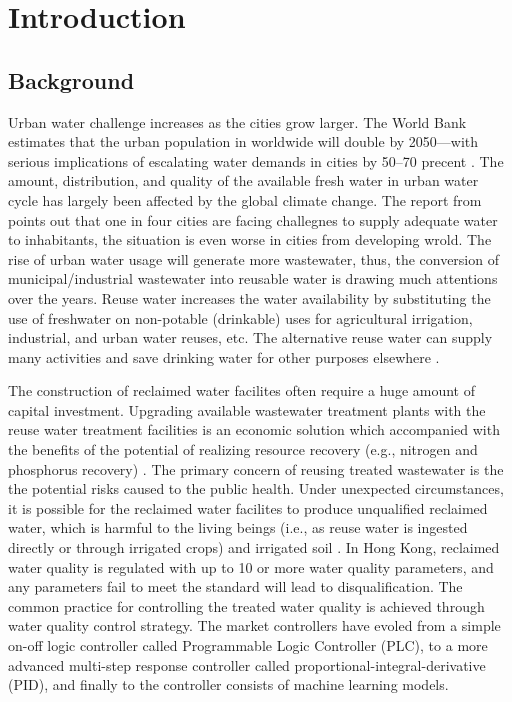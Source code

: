 \chapter{Introduction}
\section{Background}
Urban water challenge increases as the cities grow larger. The World Bank estimates that the urban population in worldwide will double by 2050---with serious implications of escalating water demands in cities by 50--70 precent \citep{theworldbankCircularEconomyOpportunity2021}. The amount, distribution, and quality of the available fresh water in urban water cycle has largely been affected by the global climate change. The report from \citep{unicefURBANWATERSCARCITY2021} points out that one in four cities are facing challegnes to supply adequate water to inhabitants, the situation is even worse in cities from developing wrold. The rise of urban water usage will generate more wastewater, thus, the conversion of municipal/industrial wastewater into reusable water is drawing much attentions over the years. Reuse water increases the water availability by substituting the use of freshwater on non-potable (drinkable) uses for agricultural irrigation, industrial, and urban water reuses, etc. The alternative reuse water can supply many activities and save drinking water for other purposes elsewhere \citep{adewumiTreatedWastewaterReuse2010}.

The construction of reclaimed water facilites often require a huge amount of capital investment. Upgrading available wastewater treatment plants with the reuse water treatment facilities is an economic solution which accompanied with the benefits of the potential of realizing resource recovery (e.g., nitrogen and phosphorus recovery) \citep{maryamWastewaterReclamationReuse2019,kehreinCriticalReviewResource2020}. The primary concern of reusing treated wastewater is the the potential risks caused to the public health. Under unexpected circumstances, it is possible for the reclaimed water facilites to produce unqualified reclaimed water, which is harmful to the living beings (i.e., as reuse water is ingested directly or through irrigated crops) and irrigated soil \citep{adewumiTreatedWastewaterReuse2010}. In Hong Kong, reclaimed water quality is regulated with up to 10 or more water quality parameters, and any parameters fail to meet the standard will lead to disqualification. The common practice for controlling the treated water quality is achieved through water quality control strategy. The market controllers have evoled from a simple on-off logic controller called Programmable Logic Controller (PLC), to a more advanced multi-step response controller called proportional-integral-derivative (PID), and finally to the controller consists of machine learning models. 

